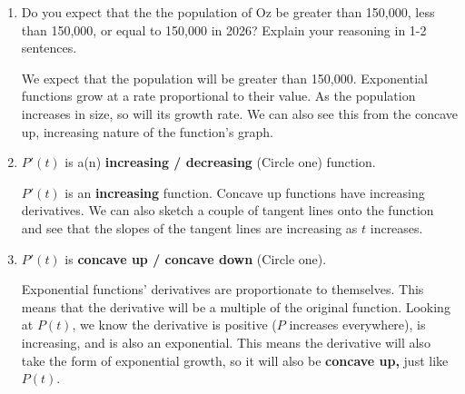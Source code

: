 \documentclass{article}
\theoremstyle{theorem}
\begin{document}
\begin{enumerate}
\begin{enumerate}
      \begin{solution}
      \end{solution}
    \item \begin{problem}[\vfill] Do you expect that the the population of Oz be greater than 150,000, less than 150,000, or equal to 150,000 in 2026? Explain your reasoning in 1-2 sentences.\\
    \end{problem}
    \begin{solution}
        We expect that the population will be greater than 150,000. Exponential functions grow at a rate proportional to their value. As the population increases in size, so will its growth rate. We can also see this from the concave up, increasing nature of the function's graph.
    \end{solution}
    \item \begin{problem}$P'(t)$ is a(n) \textbf{increasing / decreasing} (Circle one) function.\\
    \end{problem}
    \begin{solution} 
    $P'(t)$ is an {\bf increasing }function. Concave up functions have increasing derivatives. We can also sketch a couple of tangent lines onto the function and see that the slopes of the tangent lines are increasing as $t$ increases.
    \end{solution}
    \item \begin{problem}$P'(t)$ is \textbf{concave up / concave down} (Circle one).\\
    \end{problem}
    \begin{solution}
        Exponential functions' derivatives are proportionate to themselves. This means that the derivative will be a multiple of the original function. Looking at $P(t)$, we know the derivative is positive ($P$ increases everywhere), is increasing, and is also an exponential. This means the derivative will also take the form of exponential growth, so it will also be {\bf concave up,} just like $P(t)$.
    \end{solution}
    \newpage
\end{enumerate}


\end{enumerate}
\end{document}
